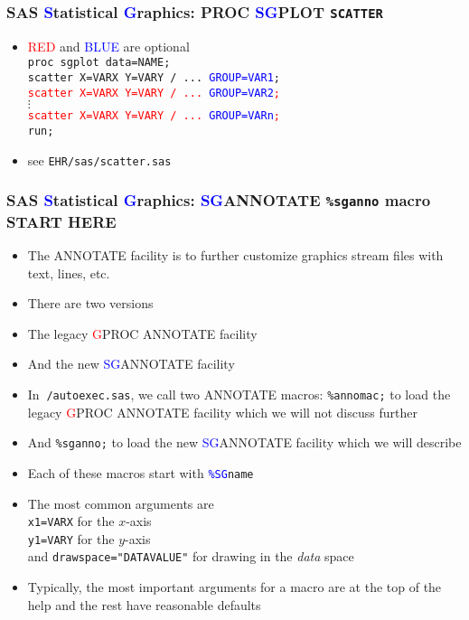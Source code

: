 \documentclass[11pt,pdftex,dvipsnames,usenames,helvetica]{beamer}
\begin{document}
\begin{frame}[fragile]
\frametitle{SAS \textcolor{blue}{S}tatistical \textcolor{blue}{G}raphics:
PROC \textcolor{blue}{SG}PLOT {\tt SCATTER}}
\begin{itemize}
\item \textcolor{red}{RED} and \textcolor{blue}{BLUE} are optional\\
{\tt proc sgplot data=NAME;\\
scatter X=VARX Y=VARY  / ... \textcolor{blue}{GROUP=VAR1};\\
\textcolor{red}{scatter X=VARX Y=VARY / ... \textcolor{blue}{GROUP=VAR2};}\\
$\vdots$\\
\textcolor{red}{scatter X=VARX Y=VARY / ... \textcolor{blue}{GROUP=VARn};}\\
run;}
\item see {\tt EHR/sas/scatter.sas}
\end{itemize}
\end{frame}

\begin{frame}[fragile]
\frametitle{SAS \textcolor{blue}{S}tatistical \textcolor{blue}{G}raphics:
\textcolor{blue}{SG}ANNOTATE {\tt \%sganno} macro START HERE }
\begin{itemize}
\item The ANNOTATE facility is to further customize graphics 
stream files with text, lines, etc.
\item There are two versions
\item The legacy \textcolor{red}{G}PROC ANNOTATE facility
\item And the new \textcolor{blue}{SG}ANNOTATE facility
\item In {\tt $~$/autoexec.sas}, we call two ANNOTATE macros:
{\tt \%annomac;} to load the legacy \textcolor{red}{G}PROC ANNOTATE
facility which we will not discuss further
\item And {\tt \%sganno;} to load the new \textcolor{blue}{SG}ANNOTATE
  facility which we will describe
\item Each of these macros start with {\tt \textcolor{blue}{\%SG}name}
\item The most common arguments are\\
 {\tt x1=VARX} for the $x$-axis\\
 {\tt y1=VARY} for the $y$-axis\\
and {\tt drawspace="DATAVALUE"} for drawing in the {\it data} space
\item Typically, the most important arguments for a macro are at 
the top of the help and the rest have reasonable defaults
\end{itemize}
\end{frame}
\end{document}

